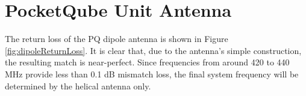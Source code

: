 \graphicspath{{./figures}}

\section{PocketQube Unit Antenna}

The return loss of the PQ dipole antenna is shown in Figure \ref{fig:dipoleReturnLoss}. It is clear that, due to the antenna's simple construction, the resulting match is near-perfect. Since frequencies from around 420 to 440 MHz provide less than 0.1 dB mismatch loss, the final system frequency will be determined by the helical antenna only.